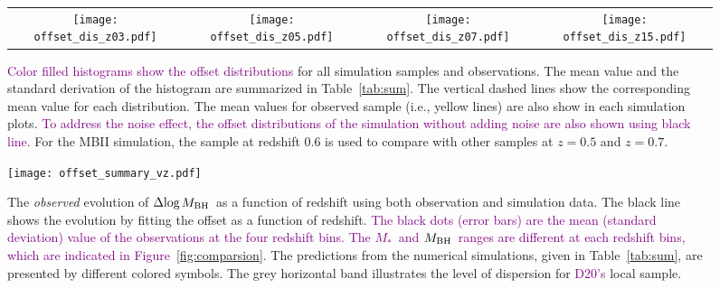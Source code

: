 \documentclass[twocolumn]{aastex631}
\newcommand{\red}[1]{\textcolor{purple}{#1}}
\def\smass{{$M_*$}}
\def\mbh{$M_{\rm BH}$}
\begin{document}
\begin{figure*}
\centering
\begin{tabular}{c c c c}
\hspace*{-0.4cm} 
{\texttt{[image: offset\_dis\_z03.pdf]}}&
\hspace*{-0.4cm} 
{\texttt{[image: offset\_dis\_z05.pdf]}}&
\hspace*{-0.4cm} 
{\texttt{[image: offset\_dis\_z07.pdf]}}&
\hspace*{-0.4cm} 
{\texttt{[image: offset\_dis\_z15.pdf]}}\\
\end{tabular}
\caption{\label{fig:offsets} 
\red{Color filled histograms show the offset distributions} for all simulation samples and observations. The mean value and the standard derivation of the histogram are summarized in Table~\ref{tab:sum}. The vertical dashed lines show the corresponding mean value for each distribution. The mean values for observed sample (i.e., yellow lines) are also show in each simulation plots. \red{To address the noise effect, the offset distributions of the simulation without adding noise are also shown using black line.}
For the MBII simulation, the sample at redshift 0.6 is used to compare with other samples at $z=0.5$ and $z=0.7$. 
}
\end{figure*} 


\begin{figure}
\centering
\texttt{[image: offset\_summary\_vz.pdf]}
\caption{\label{fig:offsets_vz} 
The {\it observed} evolution of $\Delta{\rm log}$\mbh\ as a function of redshift using both observation and simulation data. The black line shows the evolution by fitting the offset as a function of redshift. \red{The black dots (error bars) are the mean (standard deviation) value of the observations at the four redshift bins. The \smass\ and \mbh\ ranges are different at each redshift bins, which are indicated in Figure~\ref{fig:comparsion}.} The predictions from the numerical simulations, given in Table~\ref{tab:sum}, are presented by different colored symbols. The grey horizontal band illustrates the level of dispersion for \red{D20's} local sample.
}
\end{figure} 
\end{document}
